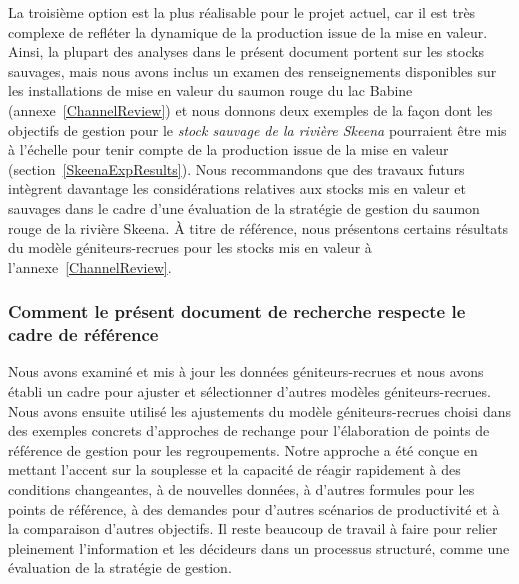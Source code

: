 \documentclass[french,11pt]{book}
\begin{document}
La troisième option est la plus réalisable pour le projet actuel, car il est très complexe de refléter la dynamique de la production issue de la mise en valeur. Ainsi, la plupart des analyses dans le présent document portent sur les stocks sauvages, mais nous avons inclus un examen des renseignements disponibles sur les installations de mise en valeur du saumon rouge du lac Babine (annexe~\ref{ChannelReview}) et nous donnons deux exemples de la façon dont les objectifs de gestion pour le \emph{stock sauvage de la rivière Skeena} pourraient être mis à l'échelle pour tenir compte de la production issue de la mise en valeur (section~\ref{SkeenaExpResults}). Nous recommandons que des travaux futurs intègrent davantage les considérations relatives aux stocks mis en valeur et sauvages dans le cadre d'une évaluation de la stratégie de gestion du saumon rouge de la rivière Skeena. À titre de référence, nous présentons certains résultats du modèle géniteurs-recrues pour les stocks mis en valeur à l'annexe~\ref{ChannelReview}.

\subsubsection{Comment le présent document de recherche respecte le cadre de référence}\label{TORLink}

Nous avons examiné et mis à jour les données géniteurs-recrues et nous avons établi un cadre pour ajuster et sélectionner d'autres modèles géniteurs-recrues. Nous avons ensuite utilisé les ajustements du modèle géniteurs-recrues choisi dans des exemples concrets d'approches de rechange pour l'élaboration de points de référence de gestion pour les regroupements. Notre approche a été conçue en mettant l'accent sur la souplesse et la capacité de réagir rapidement à des conditions changeantes, à de nouvelles données, à d'autres formules pour les points de référence, à des demandes pour d'autres scénarios de productivité et à la comparaison d'autres objectifs. Il reste beaucoup de travail à faire pour relier pleinement l'information et les décideurs dans un processus structuré, comme une évaluation de la stratégie de gestion.
\end{document}
